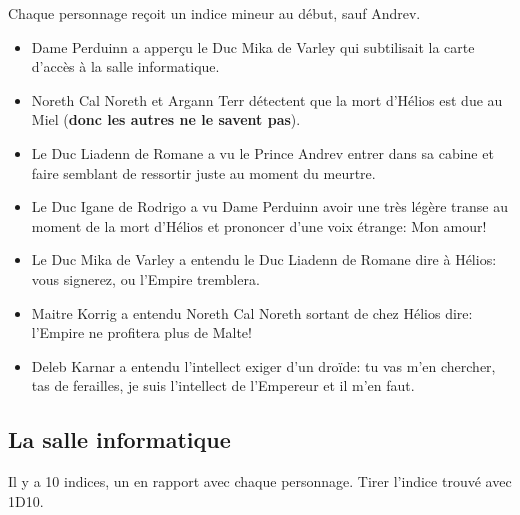 \documentclass{article}
\begin{document}
Chaque personnage reçoit un indice mineur au début, sauf Andrev.
\begin{itemize}
    \item Dame Perduinn a apperçu le Duc Mika de Varley qui subtilisait la
        carte d'accès à la salle informatique.
    \item Noreth Cal Noreth et Argann Terr détectent que la mort d'Hélios est
        due au Miel (\textbf{donc les autres ne le savent pas}).
    \item Le Duc Liadenn de Romane a vu le Prince Andrev entrer dans sa cabine
        et faire semblant de ressortir juste au moment du meurtre.
    \item Le Duc Igane de Rodrigo a vu Dame Perduinn avoir une très légère
        transe au moment de la mort d'Hélios et prononcer d'une voix étrange:
        \og Mon amour!\fg{}
    \item Le Duc Mika de Varley a entendu le Duc Liadenn de Romane dire à
        Hélios: \og vous signerez, ou l'Empire tremblera\fg{}.
    \item Maitre Korrig a entendu Noreth Cal Noreth sortant de chez Hélios
        dire: \og l'Empire ne profitera plus de Malte!\fg{}
    \item Deleb Karnar a entendu l'intellect exiger d'un droïde: \og tu vas
        m'en chercher, tas de ferailles, je suis l'intellect de l'Empereur et
        il m'en faut\fg{}.
\end{itemize}

\subsection*{La salle informatique}

Il y a 10 indices, un en rapport avec chaque personnage. Tirer l'indice trouvé
avec 1D10.
\end{document}
